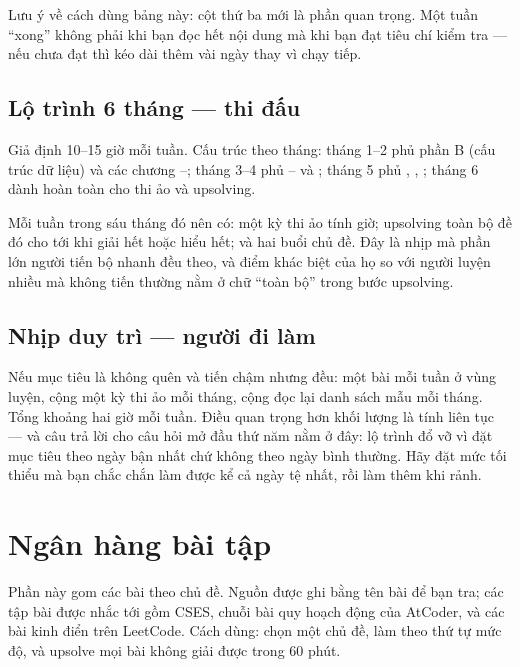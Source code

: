 \documentclass[../../algorithm.tex]{subfiles}
\begin{document}
Lưu ý về cách dùng bảng này: cột thứ ba mới là phần quan trọng. Một tuần ``xong'' không phải khi bạn đọc hết nội dung mà khi bạn đạt tiêu chí kiểm tra --- nếu chưa đạt thì kéo dài thêm vài ngày thay vì chạy tiếp.

\subsection{Lộ trình 6 tháng --- thi đấu}

Giả định 10--15 giờ mỗi tuần. Cấu trúc theo tháng: tháng 1--2 phủ phần B (cấu trúc dữ liệu) và các chương --; tháng 3--4 phủ -- và ; tháng 5 phủ , , ; tháng 6 dành hoàn toàn cho thi ảo và upsolving.

Mỗi tuần trong sáu tháng đó nên có: một kỳ thi ảo tính giờ; upsolving toàn bộ đề đó cho tới khi giải hết hoặc hiểu hết; và hai buổi chủ đề. Đây là nhịp mà phần lớn người tiến bộ nhanh đều theo, và điểm khác biệt của họ so với người luyện nhiều mà không tiến thường nằm ở chữ ``toàn bộ'' trong bước upsolving.

\subsection{Nhịp duy trì --- người đi làm}

Nếu mục tiêu là không quên và tiến chậm nhưng đều: một bài mỗi tuần ở vùng luyện, cộng một kỳ thi ảo mỗi tháng, cộng đọc lại danh sách mẫu mỗi tháng. Tổng khoảng hai giờ mỗi tuần. Điều quan trọng hơn khối lượng là tính liên tục --- và câu trả lời cho câu hỏi mở đầu thứ năm nằm ở đây: lộ trình đổ vỡ vì đặt mục tiêu theo ngày bận nhất chứ không theo ngày bình thường. Hãy đặt mức tối thiểu mà bạn chắc chắn làm được kể cả ngày tệ nhất, rồi làm thêm khi rảnh.

\section{Ngân hàng bài tập}

Phần này gom các bài theo chủ đề. Nguồn được ghi bằng tên bài để bạn tra; các tập bài được nhắc tới gồm CSES\cite{cses}, chuỗi bài quy hoạch động của AtCoder, và các bài kinh điển trên LeetCode. Cách dùng: chọn một chủ đề, làm theo thứ tự mức độ, và upsolve mọi bài không giải được trong 60 phút.
\end{document}
